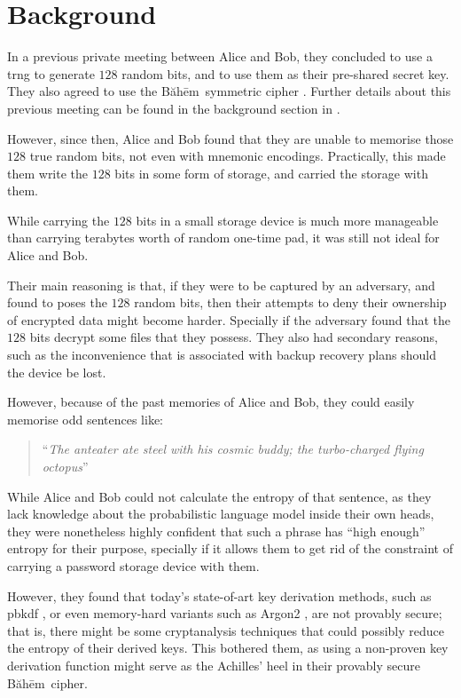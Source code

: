 \documentclass[twocolumn,hidelinks]{article}
\newcommand{\baheem}{Băhēm}
\begin{document}
\tableofcontents
\break

\section{Background}
In a previous private meeting between Alice and Bob, they concluded to use
a \gls{trng} to generate $128$ random bits, and to use them as their
pre-shared secret key.  They also agreed to use the \baheem\ symmetric
cipher \cite{baheem}.  Further details about this previous meeting can be
found in the background section in \cite{baheem}.

However, since then, Alice and Bob found that they are unable to memorise
those $128$ true random bits, not even with mnemonic encodings.
Practically, this made them write the $128$ bits in some form of storage,
and carried the storage with them.

While carrying the $128$ bits in a small storage device is much more
manageable than carrying terabytes worth of random one-time pad, it was
still not ideal for Alice and Bob.

Their main reasoning is that, if they were to be captured by an adversary,
and found to poses the $128$ random bits, then their attempts to deny their
ownership of encrypted data might become harder.  Specially if the
adversary found that the $128$ bits decrypt some files that they possess.
They also had secondary reasons, such as the inconvenience that is
associated with backup recovery plans should the device be lost.

However, because of the past memories of Alice and Bob, they could easily
memorise odd sentences like:
\begin{quote}
    ``\emph{The anteater ate steel with his cosmic buddy; the turbo-charged
    flying octopus}''
\end{quote}

While Alice and Bob could not calculate the entropy of that sentence, as
they lack knowledge about the probabilistic language model inside their own
heads, they were nonetheless highly confident that such a phrase has ``high
enough'' entropy for their purpose, specially if it allows them to get rid
of the constraint of carrying a password storage device with them.

However, they found that today's state-of-art key derivation methods, such
as \gls{pbkdf} \cite{rfc8018}, or even memory-hard variants such as Argon2
\cite{argon2}, are not provably secure; that is, there might be some
cryptanalysis techniques that could possibly reduce the entropy of their
derived keys.  This bothered them, as using a non-proven key derivation
function might serve as the Achilles' heel in their provably secure
\baheem\ cipher.
\end{document}
